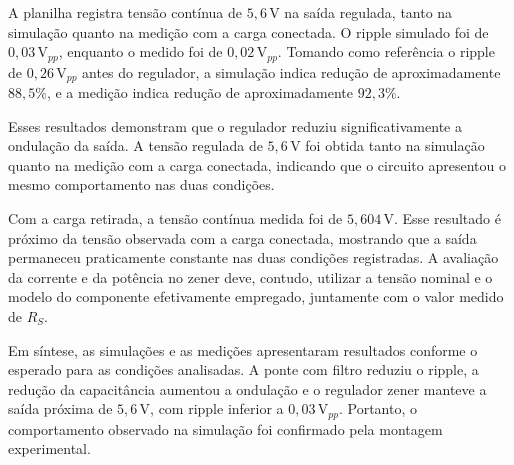 \documentclass[11pt,a4paper]{article}
\begin{document}
A planilha registra tensão contínua de $5{,}6\,\text{V}$ na saída regulada, tanto na simulação quanto na medição com a carga conectada. O ripple simulado foi de $0{,}03\,\text{V}_{pp}$, enquanto o medido foi de $0{,}02\,\text{V}_{pp}$. Tomando como referência o ripple de $0{,}26\,\text{V}_{pp}$ antes do regulador, a simulação indica redução de aproximadamente $88{,}5\%$, e a medição indica redução de aproximadamente $92{,}3\%$.

Esses resultados demonstram que o regulador reduziu significativamente a ondulação da saída. A tensão regulada de $5{,}6\,\text{V}$ foi obtida tanto na simulação quanto na medição com a carga conectada, indicando que o circuito apresentou o mesmo comportamento nas duas condições.

Com a carga retirada, a tensão contínua medida foi de $5{,}604\,\text{V}$. Esse resultado é próximo da tensão observada com a carga conectada, mostrando que a saída permaneceu praticamente constante nas duas condições registradas. A avaliação da corrente e da potência no zener deve, contudo, utilizar a tensão nominal e o modelo do componente efetivamente empregado, juntamente com o valor medido de $R_S$.

Em síntese, as simulações e as medições apresentaram resultados conforme o esperado para as condições analisadas. A ponte com filtro reduziu o ripple, a redução da capacitância aumentou a ondulação e o regulador zener manteve a saída próxima de $5{,}6\,\text{V}$, com ripple inferior a $0{,}03\,\text{V}_{pp}$. Portanto, o comportamento observado na simulação foi confirmado pela montagem experimental.





\end{document}
